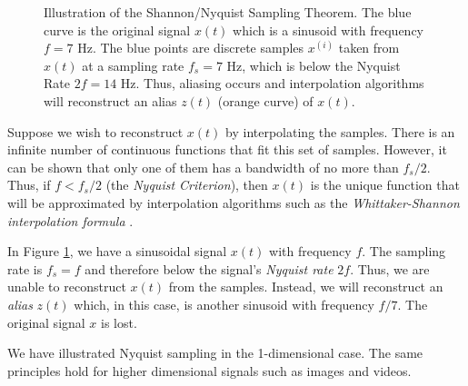 \begin{figure}
\caption[Illustration of Nyquist Sampling]{Illustration of the Shannon/Nyquist Sampling Theorem. The blue curve is the original signal $x(t)$ which is a sinusoid with frequency $f = 7$ Hz. The blue points are discrete samples $x^{(i)}$ taken from $x(t)$ at a sampling rate $f_s = 7$ Hz, which is below the Nyquist Rate $2f = 14$ Hz. Thus, aliasing occurs and interpolation algorithms will reconstruct an alias $z(t)$ (orange curve) of $x(t)$.}
\label{fig:nyquist}
\end{figure}

Suppose we wish to reconstruct $x(t)$ by interpolating the samples.
There is an infinite number of continuous functions that fit this set of samples.
However, it can be shown that only one of them has a bandwidth of no more than $f_s/2$.
Thus, if $f < f_s/2$ (the \emph{Nyquist Criterion}), then $x(t)$ is the unique function that will be approximated by interpolation algorithms such as the \emph{Whittaker-Shannon interpolation formula} \cite{shannon1949}.

In Figure \ref{fig:nyquist}, we have a sinusoidal signal $x(t)$ with frequency $f$.
The sampling rate is $f_s=f$ and therefore below the signal's \emph{Nyquist rate} $2f$. 
Thus, we are unable to reconstruct $x(t)$ from the samples. 
Instead, we will reconstruct an \emph{alias} $z(t)$ which, in this case, is another sinusoid with frequency $f/7$.
The original signal $x$ is lost.

We have illustrated Nyquist sampling in the 1-dimensional case.
The same principles hold for higher dimensional signals such as images and videos.

